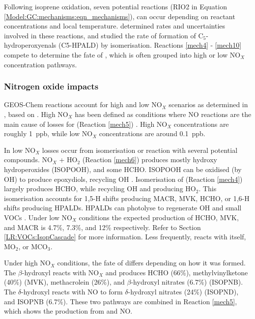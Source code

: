       Following isoprene oxidation, seven potential \roo reactions (RIO2 in Equation \ref{Model:GC:mechanisms:eqn_mechanisms}), can occur depending on reactant concentrations and local temperature.
      \textcite{Crounse2011} determined rates and uncertainties involved in these reactions, and studied the rate of formation of C$_5$-hydroperoxyenals (C5-HPALD) by isomerisation.
      Reactions \ref{mech4} - \ref{mech10} compete to determine the fate of \roo, which is often grouped into high or low NO$_X$ concentration pathways.
      
    
    \subsubsection{Nitrogen oxide impacts}
    
      GEOS-Chem reactions account for high and low NO$_X$ scenarios as determined in \textcite{Mao2013}, based on \textcite{Paulot2009a}.
      High NO$_X$ has been defined as conditions where NO reactions are the main cause of losses for \roo (Reaction \ref{mech5}) \parencite{Palmer2003}.
      High NO$_X$ concentrations are roughly 1~ppb, while low NO$_X$ concentrations are around 0.1~ppb.
      
      In low NO$_X$ \roo losses occur from isomerisation or reaction with several potential compounds.
      NO$_X$ + HO$_2$ (Reaction \ref{mech6}) produces mostly hydroxy hydroperoxides (ISOPOOH), and some HCHO.
      ISOPOOH can be oxidised (by OH) to produce epoxydiols, recycling OH \parencite{Paulot2009b}. 
      Isomerisation of \roo (Reaction \ref{mech4}) largely produces HCHO, while recycling OH and producing HO$_2$.
      This isomerisation accounts for 1,5-H shifts producing MACR, MVK, HCHO, or 1,6-H shifts producing HPALDs.
      HPALDs can photolyse to regenerate OH and small VOCs \parencite{Crounse2011,Wolfe2012, Peeters2014}.
      Under low NO$_X$ conditions the expected production of HCHO, MVK, and MACR is 4.7\%, 7.3\%, and 12\% respectively.
      Refer to Section \ref{LR:VOCs:IsopCascade} for more information.
      Less frequently, \roo reacts with itself, MO$_2$, or MCO$_3$.
      
      Under high NO$_X$ conditions, the fate of \roo differs depending on how it was formed.
      The $\beta$-hydroxyl reacts with NO$_X$ and produces HCHO (66\%), methylvinylketone (40\%) (MVK), methacrolein (26\%), and $\beta$-hydroxyl nitrates (6.7\%) (ISOPNB).
      The $\delta$-hydroxyl reacts with NO to form $\delta$-hydroxyl nitrates (24\%) (ISOPND), and ISOPNB (6.7\%).
      These two pathways are combined in Reaction \ref{mech5}, which shows the production from \roo and NO.
      

